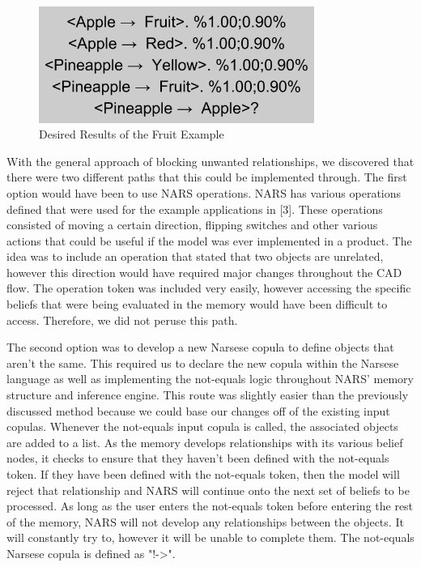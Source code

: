 \documentclass[conference]{IEEEtran}
\begin{document}
\begin{figure}[ht!]
\centering
\includegraphics[width=90mm]{Desired.png}
\caption{Desired Results of the Fruit Example \label{overflow}}
\end{figure}	

	With the general approach of blocking unwanted relationships, we discovered that there were two different paths that this could be implemented through. The first option would have been to use NARS operations. NARS has various operations defined that were used for the example applications in [3]. These operations consisted of moving a certain direction, flipping switches and other various actions that could be useful if the model was ever implemented in a product. The idea was to include an operation that stated that two objects are unrelated, however this direction would have required major changes throughout the CAD flow. The operation token was included very easily, however accessing the specific beliefs that were being evaluated in the memory would have been difficult to access. Therefore, we did not peruse this path.
	
	The second option was to develop a new Narsese copula to define objects that aren't the same. This required us to declare the new copula within the Narsese language as well as implementing the not-equals logic throughout NARS' memory structure and inference engine. This route was slightly easier than the previously discussed method because we could base our changes off of the existing input copulas. Whenever the not-equals input copula is called, the associated objects are added to a list. As the memory develops relationships with its various belief nodes, it checks to ensure that they haven't been defined with the not-equals token. If they have been defined with the not-equals token, then the model will reject that relationship and NARS will continue onto the next set of beliefs to be processed. As long as the user enters the not-equals token before entering the rest of the memory, NARS will not develop any relationships between the objects. It will constantly try to, however it will be unable to complete them. The not-equals Narsese copula is defined as "!->".
\end{document}
